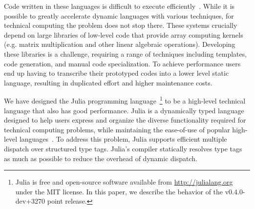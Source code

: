 Code written in these languages is difficult to execute efficiently~\cite{Joisha2001,Joisha2006,Seljebotn2009}.
While it is possible
to greatly accelerate dynamic languages with various techniques, for
technical computing the problem does not stop there. These systems
crucially depend on large libraries of low-level code that provide array
computing kernels (e.g. matrix multiplication and other linear algebraic
operations). Developing these libraries is a challenge, requiring a range of
techniques including templates, code generation, and manual code
specialization. To achieve performance users end up having to transcribe their prototyped codes into a lower level static language, resulting in duplicated effort and higher maintenance costs.

We have designed the Julia programming language~\footnote{Julia is free and open-source software available from \url{http://julialang.org} under the MIT license. In this paper, we describe the behavior of the v0.4.0-dev+3270 point release.} to be a high-level technical language that also has good performance.
Julia is a dynamically typed language designed to help users express and organize the diverse functionality required for technical computing problems, while maintaining the ease-of-use of popular high-level languages~\cite{Bezanson2012,Bezanson2014b}.
To address this problem, Julia supports efficient multiple dispatch over structured type tags.
Julia's compiler statically resolves type tags as much as possible to reduce the overhead of dynamic dispatch.



